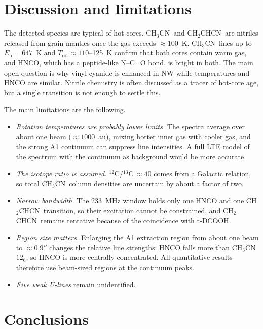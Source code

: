 \documentclass{aa}
\newcommand{\chcn}{CH$_3$CN}
\newcommand{\vycn}{CH$_2$CHCN}
\begin{document}
\section{Discussion and limitations}

The detected species are typical of hot cores. \chcn\ and \vycn\ are nitriles released from grain mantles once the gas exceeds $\approx100$~K. \chcn\ lines up to $E_\mathrm{u}=647$~K and $T_\mathrm{rot}\approx110$--125~K confirm that both cores contain warm gas, and HNCO, which has a peptide-like N--C=O bond, is bright in both. The main open question is why vinyl cyanide is enhanced in NW while temperatures and HNCO are similar. Nitrile chemistry is often discussed as a tracer of hot-core age, but a single transition is not enough to settle this.

The main limitations are the following.
\begin{itemize}
\item \textit{Rotation temperatures are probably lower limits.} The spectra average over about one beam ($\approx1000$~au), mixing hotter inner gas with cooler gas, and the strong A1 continuum can suppress line intensities. A full LTE model of the spectrum with the continuum as background would be more accurate.
\item \textit{The isotope ratio is assumed.} $^{12}$C/$^{13}$C$\,\approx40$ comes from a Galactic relation, so total \chcn\ column densities are uncertain by about a factor of two.
\item \textit{Narrow bandwidth.} The 233~MHz window holds only one HNCO and one \vycn\ transition, so their excitation cannot be constrained, and \vycn\ remains tentative because of the coincidence with t-DCOOH.
\item \textit{Region size matters.} Enlarging the A1 extraction region from about one beam to $\approx0.9''$ changes the relative line strengths: HNCO falls more than \chcn\ $12_6$, so HNCO is more centrally concentrated. All quantitative results therefore use beam-sized regions at the continuum peaks.
\item \textit{Five weak U-lines} remain unidentified.
\end{itemize}

\section{Conclusions}
\end{document}
